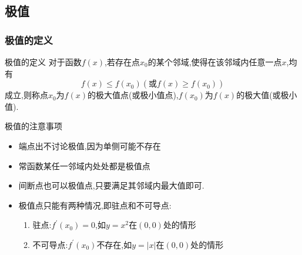 \documentclass[8pt a4paper, oneside, UTF8]{ctexbook}  %
\begin{document}
\begin{sloppypar}
    \subsection{极值}
    \subsubsection{极值的定义}
    \begin{defn}{极值的定义}{}
        对于函数$f(x)$,若存在点$x_0$的某个邻域,使得在该邻域内任意一点$x$,均有
        $$
            f(x)\leqslant f(x_0)(\text{或}f(x)\geqslant f(x_0))
        $$
        成立,则称点$x_0$为$f(x)$的极大值点(或极小值点),$f(x_0)$为$f(x)$的极大值(或极小值).
    \end{defn}
    \begin{criterion}{极值的注意事项}{}
        \begin{itemize}
            \item 端点出不讨论极值,因为单侧可能不存在
            \item 常函数某任一邻域内处处都是极值点
            \item 间断点也可以极值点,只要满足其邻域内最大值即可.
            \item 极值点只能有两种情况,即驻点和不可导点:
            \begin{enumerate}
                \item 驻点:$f^{\prime}(x_{0})=0$,如$y=x^{2}$在$(0,0)$处的情形
                \item 不可导点:$f^{\prime}(x_{0})$不存在,如$y=\left|x\right|$在$(0,0)$处的情形
            \end{enumerate}
        \end{itemize}
    \end{criterion}

\end{sloppypar}
\end{document}
